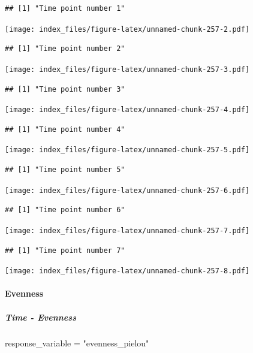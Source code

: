 \documentclass[
]{article}
\newenvironment{Shaded}{\begin{snugshade}}{\end{snugshade}}
\newcommand{\NormalTok}[1]{#1}
\newcommand{\OtherTok}[1]{\textcolor[rgb]{0.56,0.35,0.01}{#1}}
\newcommand{\StringTok}[1]{\textcolor[rgb]{0.31,0.60,0.02}{#1}}
\begin{document}
\begin{verbatim}
## [1] "Time point number 1"
\end{verbatim}

\texttt{[image: index\_files/figure-latex/unnamed-chunk-257-2.pdf]}

\begin{verbatim}
## [1] "Time point number 2"
\end{verbatim}

\texttt{[image: index\_files/figure-latex/unnamed-chunk-257-3.pdf]}

\begin{verbatim}
## [1] "Time point number 3"
\end{verbatim}

\texttt{[image: index\_files/figure-latex/unnamed-chunk-257-4.pdf]}

\begin{verbatim}
## [1] "Time point number 4"
\end{verbatim}

\texttt{[image: index\_files/figure-latex/unnamed-chunk-257-5.pdf]}

\begin{verbatim}
## [1] "Time point number 5"
\end{verbatim}

\texttt{[image: index\_files/figure-latex/unnamed-chunk-257-6.pdf]}

\begin{verbatim}
## [1] "Time point number 6"
\end{verbatim}

\texttt{[image: index\_files/figure-latex/unnamed-chunk-257-7.pdf]}

\begin{verbatim}
## [1] "Time point number 7"
\end{verbatim}

\texttt{[image: index\_files/figure-latex/unnamed-chunk-257-8.pdf]}

\hypertarget{evenness}{%
\paragraph{Evenness}\label{evenness}}

\hypertarget{time---evenness}{%
\subparagraph{Time - Evenness}\label{time---evenness}}

\begin{Shaded}
\begin{Highlighting}[]
\NormalTok{response\_variable }\OtherTok{=} \StringTok{"evenness\_pielou"}
\end{Highlighting}
\end{Shaded}
\end{document}
